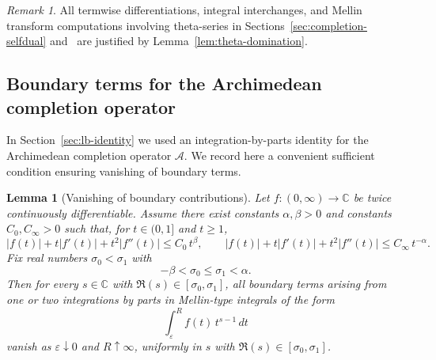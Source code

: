 \documentclass[11pt]{amsart}
\newtheorem{lemma}[theorem]{Lemma}
\theoremstyle{definition}
\theoremstyle{remark}
\newtheorem{remark}[theorem]{Remark}
\newcommand{\C}{\mathbb{C}}
\begin{document}
\begin{remark}
All termwise differentiations, integral interchanges, and Mellin transform computations involving
theta-series in Sections~\ref{sec:completion-selfdual} and~\cite{PaperI} are justified
by Lemma~\ref{lem:theta-domination}.
\end{remark}


\subsection{Boundary terms for the Archimedean completion operator}
\label{app:boundary}

In Section~\ref{sec:lb-identity} we used an integration-by-parts identity for the
Archimedean completion operator $\mathcal A$. We record here a convenient
sufficient condition ensuring vanishing of boundary terms.

\begin{lemma}[Vanishing of boundary contributions]
\label{lem:boundary-vanish}
Let $f:(0,\infty)\to\C$ be twice continuously differentiable. Assume there exist constants
$\alpha,\beta>0$ and constants $C_0,C_\infty>0$ such that, for $t\in(0,1]$ and $t\ge 1$,
\[
|f(t)|+t|f'(t)|+t^2|f''(t)| \le C_0\, t^{\beta},
\qquad
|f(t)|+t|f'(t)|+t^2|f''(t)| \le C_\infty\, t^{-\alpha}.
\]
Fix real numbers $\sigma_0<\sigma_1$ with
\[
-\beta < \sigma_0 \le \sigma_1 < \alpha.
\]
Then for every $s\in\C$ with $\Re(s)\in[\sigma_0,\sigma_1]$, all boundary terms arising from
one or two integrations by parts in Mellin-type integrals of the form
\[
\int_{\varepsilon}^{R} f(t)\,t^{s-1}\,dt
\]
vanish as $\varepsilon\downarrow0$ and $R\uparrow\infty$, uniformly in $s$ with
$\Re(s)\in[\sigma_0,\sigma_1]$.
\end{lemma}
\end{document}
